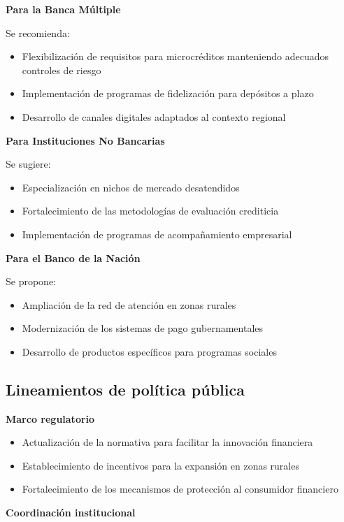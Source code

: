 \documentclass[12pt, a4paper]{article}
\begin{document}
\textbf{Para la Banca Múltiple}

Se recomienda:
\begin{itemize}
    \item Flexibilización de requisitos para microcréditos manteniendo adecuados controles de riesgo
    \item Implementación de programas de fidelización para depósitos a plazo
    \item Desarrollo de canales digitales adaptados al contexto regional
\end{itemize}

\textbf{Para Instituciones No Bancarias}

Se sugiere:
\begin{itemize}
    \item Especialización en nichos de mercado desatendidos
    \item Fortalecimiento de las metodologías de evaluación crediticia
    \item Implementación de programas de acompañamiento empresarial
\end{itemize}

\textbf{Para el Banco de la Nación}

Se propone:
\begin{itemize}
    \item Ampliación de la red de atención en zonas rurales
    \item Modernización de los sistemas de pago gubernamentales
    \item Desarrollo de productos específicos para programas sociales
\end{itemize}

\subsection{Lineamientos de política pública}

\textbf{Marco regulatorio}

\begin{itemize}
    \item Actualización de la normativa para facilitar la innovación financiera
    \item Establecimiento de incentivos para la expansión en zonas rurales
    \item Fortalecimiento de los mecanismos de protección al consumidor financiero
\end{itemize}

\textbf{Coordinación institucional}
\end{document}
